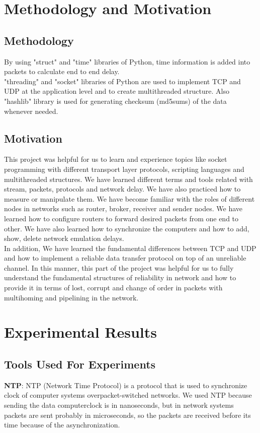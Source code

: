 \documentclass[conference]{IEEEtran}
\begin{document}
\section{Methodology and Motivation}
\subsection{Methodology}
By using "struct" and "time" libraries of Python, time information is added into packets to calculate end to end delay. \\
"threading" and "socket" libraries of Python are used to implement TCP and UDP at the application level and to create multithreaded structure. Also "hashlib" library is used for generating checksum (md5sums) of the data whenever needed.

\subsection{Motivation}
This project was helpful for us to learn and experience topics like socket programming with different transport layer protocols, scripting languages and multithreaded structures. We have learned different terms and tools related with stream, packets, protocols and network delay. We have also practiced how to measure or manipulate them.  We have become familiar with the roles of different nodes in networks such as router, broker, receiver and sender nodes. We have learned how to configure routers to forward desired packets from one end to other. We have also learned how to synchronize the computers and how to add, show, delete network emulation delays.\\

In addition, We have learned the fundamental differences between TCP and UDP and how to implement a reliable data transfer protocol on top of an unreliable channel. In this manner, this part of the project was helpful for us to fully understand the fundamental structures of reliability in network and how to provide it in terms of lost, corrupt and change of order in packets with multihoming and pipelining in the network. 

\section{Experimental Results}
\subsection{Tools Used For Experiments}
\textbf{NTP}:
NTP (Network Time Protocol) is a protocol that is used to synchronize clock of computer systems overpacket-switched networks. We used NTP because sending the data computerclock is in nanoseconds, but in network systems packets are sent probably in microseconds, so the packets are received before its time because of the asynchronization. \\
\end{document}
